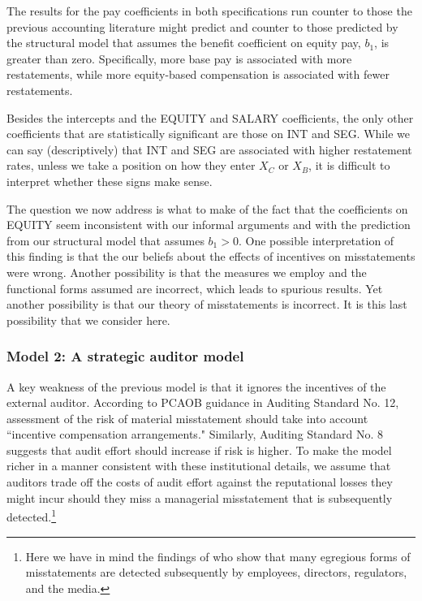 The results for the pay coefficients in both specifications run counter to those the previous accounting literature might predict and counter to those predicted by the structural model that assumes the benefit coefficient on equity pay, $b_1$, is greater than zero.
Specifically, more base pay is associated with more restatements, while more equity-based 
compensation is associated with fewer restatements.

Besides the intercepts and the EQUITY and SALARY coefficients, the only other coefficients that are statistically significant are those on INT and SEG.
While we can say (descriptively) that INT and SEG are associated with higher restatement rates, unless we take a position on how they enter $X_C$ or $X_B$, it is difficult to interpret whether these signs make sense.

The question we now address is what to make of the fact that the coefficients on EQUITY seem inconsistent with our informal arguments and with the prediction from our structural model that assumes $b_1>0$.
One possible interpretation of this finding is that the our beliefs about the effects of  incentives on misstatements were wrong.
Another possibility is that the measures we employ and the functional forms assumed are incorrect, which leads to spurious results.
Yet another possibility is that our theory of misstatements is incorrect.
It is this last possibility that we consider here.

\subsubsection{Model 2: A strategic auditor model}
A key weakness of the previous model is that it ignores the incentives of the  external auditor.
According to PCAOB guidance in Auditing Standard No. 12, assessment of the risk of material misstatement should take into account ``incentive compensation arrangements."
Similarly, Auditing Standard No. 8 suggests that audit effort should increase if risk is higher.
To make the model richer in a manner consistent with these institutional details, we assume that auditors trade off the costs of audit effort against the reputational losses they might incur should they miss a managerial misstatement that is subsequently detected.\footnote{
Here we have in mind the findings of \citet{Dyck:2010kh} who show that many egregious forms of misstatements are detected subsequently by employees, directors, regulators, and the media.} 


